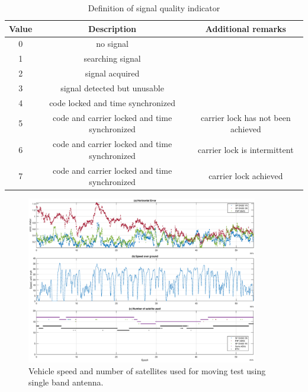 \documentclass[letterpaper, 10 pt,onecolumn]{article}
\begin{document}
	
	
	\begin{table}[H]
		\centering
		\begin{tabular}{|c|c|c|}
			\hline
			Value & Description                                   & Additional remarks                 \\ \hline
			0     & no signal                                     &                                    \\ \hline
			1     & searching signal                              &                                    \\ \hline
			2     & signal acquired                               &                                    \\ \hline
			3     & signal detected but unusable                  &                                    \\ \hline
			4     & code locked and time synchronized             &                                    \\ \hline
			5     & code and carrier locked and time synchronized & carrier lock has not been achieved \\ \hline
			6     & code and carrier locked and time synchronized & carrier lock is intermittent       \\ \hline
			7     & code and carrier locked and time synchronized & carrier lock achieved              \\ \hline
		\end{tabular}
		\caption{Definition of signal quality indicator}
		\label{tab:qi}
	\end{table}
	
	\begin{figure}[H]
		\centering
		\includegraphics[width=0.9\textwidth]{figures/dynamicinfo_single.eps}
		\caption{Vehicle speed and number of satellites used for moving test using single band antenna.}
		\label{fig:m1vspeed}
	\end{figure}
	
\end{document}
